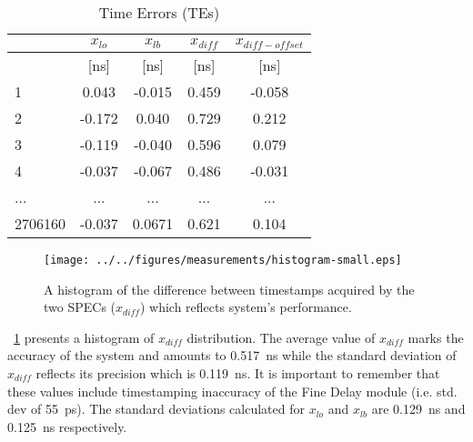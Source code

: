 \begin{table}[!t]
\caption{Time Errors (TEs)}
\centering
\begin{tabular}{| l | c| c | c | c |}          \hline
& \textbf{$x_{lo}$} & \textbf{$x_{lb}$} & \textbf{$x_{diff}$} & \textbf{$x_{diff-offset}$}\\   \hline
       & [ns]  &  [ns]  & [ns]  &  [ns]  \\   \hline
1      & 0.043 & -0.015 & 0.459 & -0.058 \\   \hline
2      &-0.172 &  0.040 & 0.729 &  0.212 \\   \hline
3      &-0.119 & -0.040 & 0.596 &  0.079 \\   \hline
4      &-0.037 & -0.067 & 0.486 & -0.031 \\   \hline
...    &  ...  &  ...   &  ...  &  ...   \\   \hline
2706160&-0.037 & 0.0671 & 0.621 & 0.104 \\   \hline
\end{tabular}
\label{tab:notRawData}
\end{table}

\begin{figure}[!t]
\centering
\texttt{[image: ../../figures/measurements/histogram-small.eps]}
\caption{A histogram of the difference between timestamps 
acquired by the two SPECs ($x_{diff}$) which reflects system's performance.}
\label{fig:teAndHist}
\end{figure}



\figurename~\ref{fig:teAndHist} presents a histogram of $x_{diff}$ distribution. 
The average value of $x_{diff}$ marks the accuracy of the system and amounts to 0.517~ns
while the standard deviation of $x_{diff}$ reflects its precision which is 0.119~ns.
It is important to remember that these values include timestamping inaccuracy of the 
Fine Delay \cite{biblio:fineDelay} module (i.e. std. dev of 55~ps). 
The standard deviations calculated for $x_{lo}$ and $x_{lb}$ are 0.129~ns and 
0.125~ns respectively.

